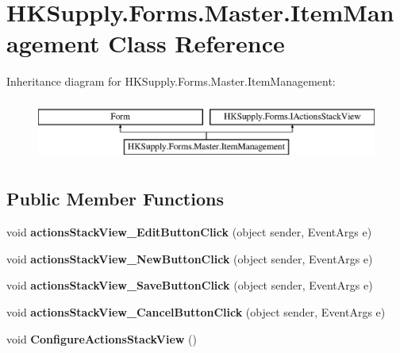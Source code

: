 \hypertarget{class_h_k_supply_1_1_forms_1_1_master_1_1_item_management}{}\section{H\+K\+Supply.\+Forms.\+Master.\+Item\+Management Class Reference}
\label{class_h_k_supply_1_1_forms_1_1_master_1_1_item_management}
Inheritance diagram for H\+K\+Supply.\+Forms.\+Master.\+Item\+Management\+:\begin{figure}[H]
\begin{center}
\leavevmode
\includegraphics[height=2.000000cm]{class_h_k_supply_1_1_forms_1_1_master_1_1_item_management}
\end{center}
\end{figure}
\subsection*{Public Member Functions}
\begin{DoxyCompactItemize}
\item 
\mbox{\label{class_h_k_supply_1_1_forms_1_1_master_1_1_item_management_a760aba0348089b7c2fb353a509775741}} 
void {\bfseries actions\+Stack\+View\+\_\+\+Edit\+Button\+Click} (object sender, Event\+Args e)
\item 
\mbox{\label{class_h_k_supply_1_1_forms_1_1_master_1_1_item_management_a32edb1b0900c7d9961a5bae7e417b08d}} 
void {\bfseries actions\+Stack\+View\+\_\+\+New\+Button\+Click} (object sender, Event\+Args e)
\item 
\mbox{\label{class_h_k_supply_1_1_forms_1_1_master_1_1_item_management_ab2d275c709c803627d8ddc617367d11e}} 
void {\bfseries actions\+Stack\+View\+\_\+\+Save\+Button\+Click} (object sender, Event\+Args e)
\item 
\mbox{\label{class_h_k_supply_1_1_forms_1_1_master_1_1_item_management_a3cb0dae020f09b83c71e6b59a4985868}} 
void {\bfseries actions\+Stack\+View\+\_\+\+Cancel\+Button\+Click} (object sender, Event\+Args e)
\item 
\mbox{\label{class_h_k_supply_1_1_forms_1_1_master_1_1_item_management_ad9299981fa7630ccaae87fd985fb0053}} 
void {\bfseries Configure\+Actions\+Stack\+View} ()
\end{DoxyCompactItemize}
